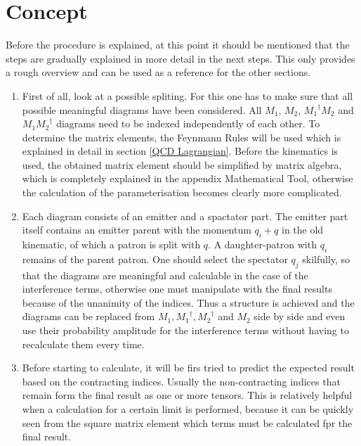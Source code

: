 \section*{Concept}
\label{Concept}
Before the procedure is explained, at this point it should be mentioned that the steps are gradually explained in more detail in the next steps. This only provides a rough overview and can be used as a reference for the other sections.
\\
\renewcommand{\labelenumi}{\roman{enumi})}
\begin{enumerate}
\item First of all, look at a possible spliting. For this one has to make sure that all possible meaningful diagrams have been considered.
All $ M_1 $, $ M_2 $, $ {M_1}^{\dagger} M_2 $ and $ M_1{M_2}^{\dagger}$ diagrams need to be indexed independently of each other.  To determine the matrix elements, the Feynmann Rules will be used which is explained in detail in section \ref{QCD Lagrangian}. Before the kinematics is used, the obtained matrix element should be simplified by matrix algebra, which is completely explained in the appendix Mathematical Tool, otherwise the calculation of the parameterisation becomes clearly more complicated.
\\
\item Each diagram consists of an emitter and a spactator part.
The emitter part itself contains an emitter parent with the momentum $ q_i+q $ in the old kinematic, of which a patron is split with $ q $. A daughter-patron with $ q_i $ remains of the parent patron. One should select the spectator $ q_j $ skilfully, so that the diagrams are meaningful and calculable in the case of the interference terms, otherwise one must manipulate with the final results because of the unanimity of the indices. Thus a structure is achieved and the diagrams can be replaced from $ M_1, {M_1}^{\dagger}, {M_2}^{\dagger}$ and $ M_2 $ side by side and even use their probability amplitude for the interference terms without having to recalculate them every time. 
\\
\item Before starting to calculate, it will be firs tried to predict the expected result based on the contracting indices. Usually the non-contracting indices that remain form the final result as one or more tensors. This is relatively helpful when a calculation for a certain limit is performed, because it can be quickly seen from the square matrix element which terms must be calculated fpr the final result.
\\

\end{enumerate}
